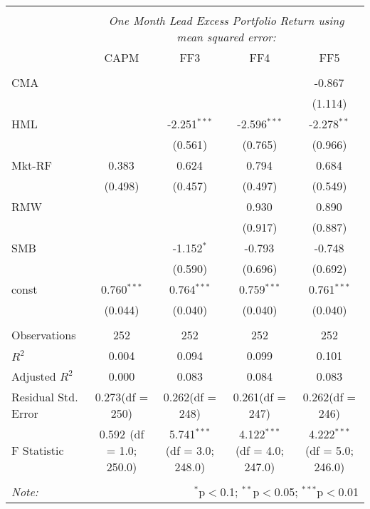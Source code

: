 \begin{table}[!htbp] \centering
\begin{tabular}{@{\extracolsep{5pt}}lcccc}
\\[-1.8ex]\hline
\hline \\[-1.8ex]
& \multicolumn{4}{c}{\textit{One Month Lead Excess Portfolio Return using mean squared error:}} \
\cr \cline{4-5}
\\[-1.8ex] & CAPM & FF3 & FF4 & FF5 \\
\hline \\[-1.8ex]
 CMA & & & & -0.867$^{}$ \\
  & & & & (1.114) \\
 HML & & -2.251$^{***}$ & -2.596$^{***}$ & -2.278$^{**}$ \\
  & & (0.561) & (0.765) & (0.966) \\
 Mkt-RF & 0.383$^{}$ & 0.624$^{}$ & 0.794$^{}$ & 0.684$^{}$ \\
  & (0.498) & (0.457) & (0.497) & (0.549) \\
 RMW & & & 0.930$^{}$ & 0.890$^{}$ \\
  & & & (0.917) & (0.887) \\
 SMB & & -1.152$^{*}$ & -0.793$^{}$ & -0.748$^{}$ \\
  & & (0.590) & (0.696) & (0.692) \\
 const & 0.760$^{***}$ & 0.764$^{***}$ & 0.759$^{***}$ & 0.761$^{***}$ \\
  & (0.044) & (0.040) & (0.040) & (0.040) \\
\hline \\[-1.8ex]
 Observations & 252 & 252 & 252 & 252 \\
 $R^2$ & 0.004 & 0.094 & 0.099 & 0.101 \\
 Adjusted $R^2$ & 0.000 & 0.083 & 0.084 & 0.083 \\
 Residual Std. Error & 0.273(df = 250) & 0.262(df = 248) & 0.261(df = 247) & 0.262(df = 246)  \\
 F Statistic & 0.592$^{}$ (df = 1.0; 250.0) & 5.741$^{***}$ (df = 3.0; 248.0) & 4.122$^{***}$ (df = 4.0; 247.0) & 4.222$^{***}$ (df = 5.0; 246.0) \\
\hline
\hline \\[-1.8ex]
\textit{Note:} & \multicolumn{4}{r}{$^{*}$p$<$0.1; $^{**}$p$<$0.05; $^{***}$p$<$0.01} \\
\end{tabular}
\end{table}
